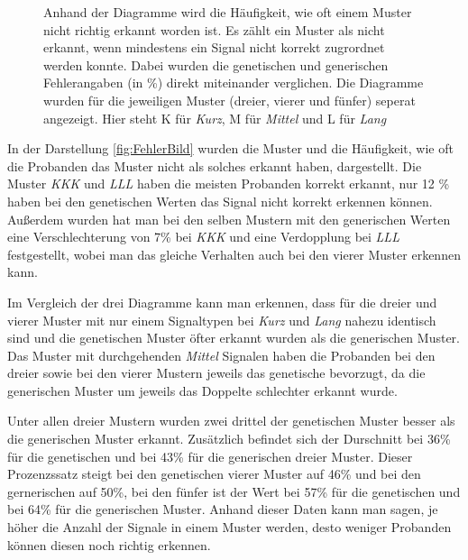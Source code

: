 \begin{figure}[htbp]
\begin{minipage}[t]{0.8\textwidth}
	\end{minipage}
	\caption{Anhand der Diagramme wird die H{\"a}ufigkeit, wie oft einem Muster nicht richtig erkannt worden ist. Es z{\"a}hlt ein Muster als nicht erkannt, wenn mindestens ein Signal nicht korrekt zugrordnet werden konnte.   
	Dabei wurden die genetischen und generischen Fehlerangaben (in \%) direkt miteinander verglichen. 
	Die Diagramme wurden f{\"u}r die jeweiligen Muster (dreier, vierer und f{\"u}nfer) seperat angezeigt.
	Hier steht K f{\"u}r \textit{Kurz}, M f{\"u}r \textit{Mittel} und L f{\"u}r \textit{Lang}}
	\label{fig:FehlerBild}
\end{figure}
 
In der Darstellung \autoref{fig:FehlerBild} wurden die Muster und die H{\"a}ufigkeit, wie oft die Probanden das Muster nicht als solches erkannt haben, dargestellt. 
Die Muster \textit{KKK} und \textit{LLL} haben die meisten Probanden korrekt erkannt, nur 12 \% haben bei den genetischen Werten das Signal nicht korrekt erkennen k{\"o}nnen. 
Au{\ss}erdem wurden hat man bei den selben Mustern mit den generischen Werten eine Verschlechterung von 7\% bei \textit{KKK} und eine Verdopplung bei \textit{LLL} festgestellt, wobei man das gleiche Verhalten auch bei den vierer Muster erkennen kann.

Im Vergleich der drei Diagramme kann man erkennen, dass f{\"u}r die dreier und vierer Muster mit nur einem Signaltypen bei \textit{Kurz} und \textit{Lang} nahezu identisch sind und die genetischen Muster {\"o}fter erkannt wurden als die generischen Muster. 
Das Muster mit durchgehenden \textit{Mittel} Signalen haben die Probanden bei den dreier sowie bei den vierer Mustern jeweils das genetische bevorzugt, da die generischen Muster um jeweils das Doppelte schlechter erkannt wurde. 

Unter allen dreier Mustern wurden zwei drittel der genetischen Muster besser als die generischen Muster erkannt. 
Zus{\"a}tzlich befindet sich der Durschnitt bei 36\% f{\"u}r die genetischen und bei 43\% f{\"u}r die generischen dreier Muster.
Dieser Prozenzssatz steigt bei den genetischen vierer Muster auf 46\% und bei den gernerischen auf 50\%, bei den f{\"u}nfer ist der Wert bei 57\% f{\"u}r die genetischen und bei 64\% f{\"u}r die generischen Muster. 
Anhand dieser Daten kann man sagen, je h{\"o}her die Anzahl der Signale in einem Muster werden, desto weniger Probanden k{\"o}nnen diesen noch richtig erkennen.

